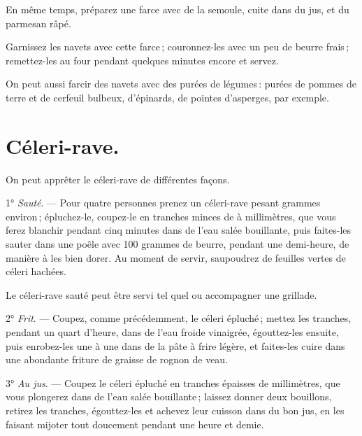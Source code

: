 En même temps, préparez une farce avec de la semoule, cuite dans du jus, et du
parmesan râpé.

Garnissez les navets avec cette farce ; couronnez-les avec un peu de beurre
frais ; remettez-les au four pendant quelques minutes encore et servez.

\sk

On peut aussi farcir des navets avec des purées de légumes : purées de pommes
de terre et de cerfeuil bulbeux, d'épinards, de pointes d'asperges, par exemple.

\section*{\centering Céleri-rave.}
{}

On peut apprêter le céleri-rave de différentes façons.

\medskip

1° \textit{Sauté}. — Pour quatre personnes prenez un céleri-rave pesant
{\mmm} grammes environ ; épluchez-le, coupez-le en tranches minces de
{\mmm} à {\mmm} millimètres, que vous ferez blanchir pendant cinq
minutes dans de l'eau salée bouillante, puis faites-les sauter dans une poêle
avec 100 grammes de beurre, pendant une demi-heure, de manière à les bien
dorer. Au moment de servir, saupoudrez de feuilles vertes de céleri hachées.

Le céleri-rave sauté peut être servi tel quel ou accompagner une grillade.

\medskip

2° \textit{Frit}. — Coupez, comme précédemment, le céleri épluché ; mettez les
tranches, pendant un quart d'heure, dans de l'eau froide vinaigrée,
égouttez-les ensuite, puis enrobez-les une à une dans de la pâte à frire
légère, et faites-les cuire dans une abondante friture de graisse de rognon de
veau.

\medskip

3° \textit{Au jus}. — Coupez le céleri épluché en tranches épaisses de
{\mmm} millimètres, que vous plongerez dans de l'eau salée bouillante ;
laissez donner deux bouillons, retirez les tranches, égouttez-les et achevez
leur cuisson dans du bon jus, en les faisant mijoter tout doucement pendant une
heure et demie.

\medskip


